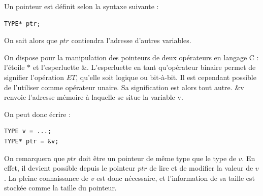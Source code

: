 \documentclass[../../../main.tex]{subfiles}
\begin{document}
Un pointeur est définit selon la syntaxe suivante :
\begin{verbatim}
TYPE* ptr;
\end{verbatim}
On sait alors que $ptr$ contiendra l'adresse d'autres variables.
 
On dispose pour la manipulation des pointeurs de deux opérateurs en langage C : l'étoile $\ast$ et l'esperluette $\&$. L'esperluette en tant qu'opérateur binaire permet de signifier l'opération $ET$, qu'elle soit logique ou bit-à-bit. Il est cependant possible de l'utiliser comme opérateur unaire. Sa signification est alors tout autre. \textsf{\&v} renvoie l'adresse mémoire à laquelle se situe la variable \textsf{v}. 

\begin{minipage}{\textwidth}
	\begin{center}
		
	\end{center}
\end{minipage}

On peut donc écrire :
\begin{verbatim}
TYPE v = ...;
TYPE* ptr = &v;
\end{verbatim}
On remarquera que $ptr$ doit être un pointeur de même type que le type de $v$. En effet, il devient possible depuis le pointeur $ptr$ de lire et de modifier la valeur de $v$. La pleine connaissance de $v$ est donc nécessaire, et l'information de sa taille est stockée comme la taille du pointeur.
\end{document}
